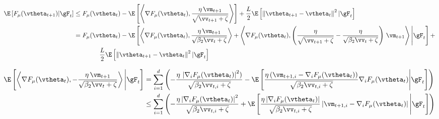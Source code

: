 
\begin{equation}
\begin{aligned}
\E\left[F_{\mu}(\vtheta_{t+1})|\gF_t\right] &\leq F_{\mu}(\vtheta_t) - \E\left[\left\langle\nabla F_{\mu}(\vtheta_t), \frac{\eta\,\vm_{t+1}}{\sqrt{\vv_{t+1} + \zeta}}\right\rangle\right] + \frac{L}{2}\E\left[\left\|\vtheta_{t+1}-\vtheta_{t}\right\|^2 | \gF_t\right] \\
&= F_{\mu}(\vtheta_t) - \E\left[\left\langle\nabla F_{\mu}(\vtheta_t), \frac{\eta\,\vm_{t+1}}{\sqrt{\beta_2\vv_t + \zeta}}\right\rangle + \left\langle\nabla F_{\mu}(\vtheta_t), \left(\frac{\eta}{\sqrt{\vv_{t+1} + \zeta}} - \frac{\eta}{\sqrt{\beta_2\vv_t + \zeta}}\right)\,\vm_{t+1}\right\rangle \Bigg| \gF_t\right] + \\
&\qquad \qquad \frac{L}{2}\E\left[\left\|\vtheta_{t+1}-\vtheta_{t}\right\|^2 | \gF_t\right]
\end{aligned}
\end{equation}

\begin{equation}
\begin{aligned}
\E\left[\left\langle\nabla F_{\mu}(\vtheta_t), -\frac{\eta\,\vm_{t+1}}{\sqrt{\beta_2\vv_t + \zeta}}\right\rangle \Bigg| \gF_t\right] &= \sum_{i=1}^d \left(- \frac{\eta\,\left|\nabla_i F_{\mu}(\vtheta_t)\right|^2)}{\sqrt{\beta_2\vv_{t,i} + \zeta}} - \E\left[\frac{\eta\left(\vm_{t+1,i} - \nabla_i F_{\mu}(\vtheta_t)\right)}{\sqrt{\beta_2\vv_{t,i} + \zeta}}\nabla_i F_{\mu}(\vtheta_t)\Bigg| \gF_t\right]\right) \\
&\leq \sum_{i=1}^d \left(- \frac{\eta\left|\nabla_i F_{\mu}(\vtheta_t)\right|^2}{\sqrt{\beta_2\vv_{t,i} + \zeta}} + \E\left[\frac{\eta \left|\nabla_i F_{\mu}(\vtheta_t)\right|}{\sqrt{\beta_2\vv_{t,i}+\zeta}}\left|\vm_{t+1,i} - \nabla_i F_{\mu}(\vtheta_t)\right|\Bigg| \gF_t\right]\right)
\end{aligned}
\end{equation}

